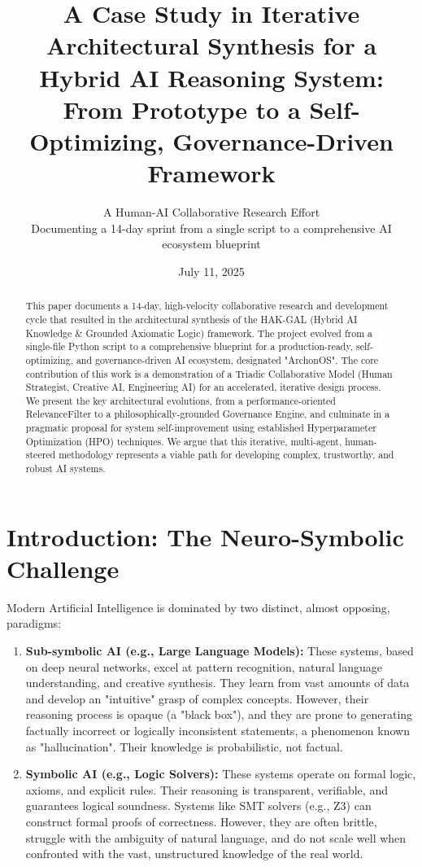 \documentclass[11pt, a4paper]{article}
\title{\textbf{A Case Study in Iterative Architectural Synthesis for a Hybrid AI Reasoning System: From Prototype to a Self-Optimizing, Governance-Driven Framework}\\[1cm]}
\author{A Human-AI Collaborative Research Effort \\ \small{Documenting a 14-day sprint from a single script to a comprehensive AI ecosystem blueprint}}
\date{July 11, 2025}
\begin{document}
\maketitle
\thispagestyle{empty}
\tableofcontents
\newpage

\begin{abstract}
\noindent This paper documents a 14-day, high-velocity collaborative research and development cycle that resulted in the architectural synthesis of the HAK-GAL (Hybrid AI Knowledge \& Grounded Axiomatic Logic) framework. The project evolved from a single-file Python script to a comprehensive blueprint for a production-ready, self-optimizing, and governance-driven AI ecosystem, designated "ArchonOS". The core contribution of this work is a demonstration of a Triadic Collaborative Model (Human Strategist, Creative AI, Engineering AI) for an accelerated, iterative design process. We present the key architectural evolutions, from a performance-oriented RelevanceFilter to a philosophically-grounded Governance Engine, and culminate in a pragmatic proposal for system self-improvement using established Hyperparameter Optimization (HPO) techniques. We argue that this iterative, multi-agent, human-steered methodology represents a viable path for developing complex, trustworthy, and robust AI systems.
\end{abstract}

\section{Introduction: The Neuro-Symbolic Challenge}
\label{sec:challenge}

Modern Artificial Intelligence is dominated by two distinct, almost opposing, paradigms:

\begin{enumerate}
    \item \textbf{Sub-symbolic AI (e.g., Large Language Models):} These systems, based on deep neural networks, excel at pattern recognition, natural language understanding, and creative synthesis. They learn from vast amounts of data and develop an "intuitive" grasp of complex concepts. However, their reasoning process is opaque (a "black box"), and they are prone to generating factually incorrect or logically inconsistent statements, a phenomenon known as "hallucination". Their knowledge is probabilistic, not factual.
    
    \item \textbf{Symbolic AI (e.g., Logic Solvers):} These systems operate on formal logic, axioms, and explicit rules. Their reasoning is transparent, verifiable, and guarantees logical soundness. Systems like SMT solvers (e.g., Z3) can construct formal proofs of correctness. However, they are often brittle, struggle with the ambiguity of natural language, and do not scale well when confronted with the vast, unstructured knowledge of the real world.
\end{enumerate}
\end{document}
